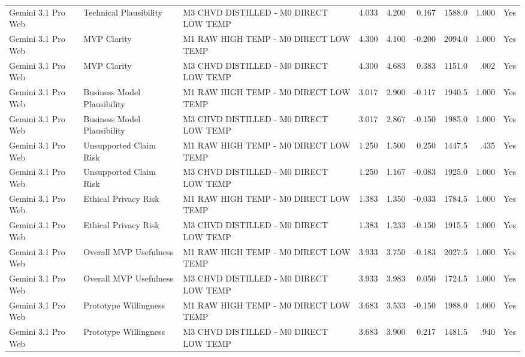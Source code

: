 \documentclass[10pt]{article}
\begin{document}
\begin{landscape}
\begin{longtable}{lllrrrrrr}
Gemini 3.1 Pro Web & Technical Plausibility & M3 CHVD DISTILLED - M0 DIRECT LOW TEMP & 4.033 & 4.200 & 0.167 & 1588.0 & 1.000 & Yes \\
Gemini 3.1 Pro Web & MVP Clarity & M1 RAW HIGH TEMP - M0 DIRECT LOW TEMP & 4.300 & 4.100 & -0.200 & 2094.0 & 1.000 & Yes \\
Gemini 3.1 Pro Web & MVP Clarity & M3 CHVD DISTILLED - M0 DIRECT LOW TEMP & 4.300 & 4.683 & 0.383 & 1151.0 & .002 & Yes \\
Gemini 3.1 Pro Web & Business Model Plausibility & M1 RAW HIGH TEMP - M0 DIRECT LOW TEMP & 3.017 & 2.900 & -0.117 & 1940.5 & 1.000 & Yes \\
Gemini 3.1 Pro Web & Business Model Plausibility & M3 CHVD DISTILLED - M0 DIRECT LOW TEMP & 3.017 & 2.867 & -0.150 & 1985.0 & 1.000 & Yes \\
Gemini 3.1 Pro Web & Unsupported Claim Risk & M1 RAW HIGH TEMP - M0 DIRECT LOW TEMP & 1.250 & 1.500 & 0.250 & 1447.5 & .435 & Yes \\
Gemini 3.1 Pro Web & Unsupported Claim Risk & M3 CHVD DISTILLED - M0 DIRECT LOW TEMP & 1.250 & 1.167 & -0.083 & 1925.0 & 1.000 & Yes \\
Gemini 3.1 Pro Web & Ethical Privacy Risk & M1 RAW HIGH TEMP - M0 DIRECT LOW TEMP & 1.383 & 1.350 & -0.033 & 1784.5 & 1.000 & Yes \\
Gemini 3.1 Pro Web & Ethical Privacy Risk & M3 CHVD DISTILLED - M0 DIRECT LOW TEMP & 1.383 & 1.233 & -0.150 & 1915.5 & 1.000 & Yes \\
Gemini 3.1 Pro Web & Overall MVP Usefulness & M1 RAW HIGH TEMP - M0 DIRECT LOW TEMP & 3.933 & 3.750 & -0.183 & 2027.5 & 1.000 & Yes \\
Gemini 3.1 Pro Web & Overall MVP Usefulness & M3 CHVD DISTILLED - M0 DIRECT LOW TEMP & 3.933 & 3.983 & 0.050 & 1724.5 & 1.000 & Yes \\
Gemini 3.1 Pro Web & Prototype Willingness & M1 RAW HIGH TEMP - M0 DIRECT LOW TEMP & 3.683 & 3.533 & -0.150 & 1988.0 & 1.000 & Yes \\
Gemini 3.1 Pro Web & Prototype Willingness & M3 CHVD DISTILLED - M0 DIRECT LOW TEMP & 3.683 & 3.900 & 0.217 & 1481.5 & .940 & Yes \\
\end{longtable}
\end{landscape}
\end{document}
